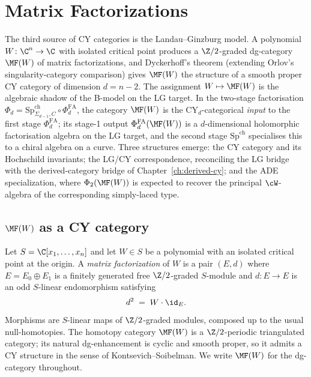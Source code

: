 \providecommand{\PhiFA}{\Phi^{\mathrm{FA}}}
\providecommand{\HolFA}{\mathrm{HolFA}}
\providecommand{\EdHolFA}{E_d\text{-}\HolFA}
\providecommand{\EnHolFA}{E_n\text{-}\HolFA}
\providecommand{\SpCh}{\mathrm{Sp}^{\mathrm{ch}}}
\providecommand{\intSigma}{\textstyle\int_{\Sigma_{d-1}}}
\providecommand{\hCS}{\mathrm{hCS}}

\chapter{Matrix Factorizations}
\label{ch:matrix-factorizations}

The third source of CY categories is the Landau--Ginzburg model. A polynomial $W \colon \C^n \to \C$ with isolated critical point produces a $\Z/2$-graded dg-category $\MF(W)$ of matrix factorizations, and Dyckerhoff's theorem (extending Orlov's singularity-category comparison) gives $\MF(W)$ the structure of a smooth proper CY category of dimension $d = n - 2$. The assignment $W \mapsto \MF(W)$ is the algebraic shadow of the B-model on the LG target. In the two-stage factorisation $\Phi_d = \SpCh_{\Sigma_{d-1},C} \circ \PhiFA_d$, the category $\MF(W)$ is the CY$_d$-categorical \emph{input} to the first stage $\PhiFA_d$; its stage-1 output $\PhiFA_d(\MF(W))$ is a $d$-dimensional holomorphic factorisation algebra on the LG target, and the second stage $\SpCh$ specialises this to a chiral algebra on a curve. Three structures emerge: the CY category and its Hochschild invariants; the LG/CY correspondence, reconciling the LG bridge with the derived-category bridge of Chapter~\ref{ch:derived-cy}; and the ADE specialization, where $\Phi_2(\MF(W))$ is expected to recover the principal $\cW$-algebra of the corresponding simply-laced type.

\section{\texorpdfstring{$\MF(W)$}{MF(W)} as a CY category}
\label{sec:mf-cy-category}

Let $S = \C[x_1, \ldots, x_n]$ and let $W \in S$ be a polynomial with an isolated critical point at the origin. A \emph{matrix factorization} of $W$ is a pair $(E, d)$ where $E = E_0 \oplus E_1$ is a finitely generated free $\Z/2$-graded $S$-module and $d \colon E \to E$ is an odd $S$-linear endomorphism satisfying
\[
 d^{2} \;=\; W \cdot \id_E .
\]
Morphisms are $S$-linear maps of $\Z/2$-graded modules, composed up to the usual null-homotopies. The homotopy category $\MF(W)$ is a $\Z/2$-periodic triangulated category; its natural dg-enhancement is cyclic and smooth proper, so it admits a CY structure in the sense of Kontsevich--Soibelman. We write $\MF(W)$ for the dg-category throughout.

